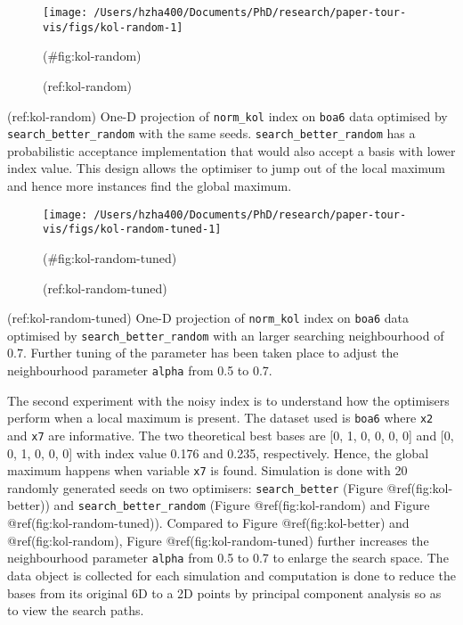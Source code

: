 \begin{Schunk}
\begin{figure}

{\centering \texttt{[image: /Users/hzha400/Documents/PhD/research/paper-tour-vis/figs/kol-random-1]} 

}

\caption[(ref:kol-random)]{(ref:kol-random)}(\#fig:kol-random)
\end{figure}
\end{Schunk}

(ref:kol-random) One-D projection of \texttt{norm\_kol} index on \texttt{boa6} data optimised by \texttt{search\_better\_random} with the same seeds. \texttt{search\_better\_random} has a probabilistic acceptance implementation that would also accept a basis with lower index value. This design allows the optimiser to jump out of the local maximum and hence more instances find the global maximum.

\begin{Schunk}
\begin{figure}

{\centering \texttt{[image: /Users/hzha400/Documents/PhD/research/paper-tour-vis/figs/kol-random-tuned-1]} 

}

\caption[(ref:kol-random-tuned)]{(ref:kol-random-tuned)}(\#fig:kol-random-tuned)
\end{figure}
\end{Schunk}

(ref:kol-random-tuned) One-D projection of \texttt{norm\_kol} index on \texttt{boa6} data optimised by \texttt{search\_better\_random} with an larger searching neighbourhood of 0.7. Further tuning of the parameter has been taken place to adjust the neighbourhood parameter \texttt{alpha} from 0.5 to 0.7.

The second experiment with the noisy index is to understand how the optimisers perform when a local maximum is present. The dataset used is \texttt{boa6} where \texttt{x2} and \texttt{x7} are informative. The two theoretical best bases are {[}0, 1, 0, 0, 0, 0{]} and {[}0, 0, 1, 0, 0, 0{]} with index value 0.176 and 0.235, respectively. Hence, the global maximum happens when variable \texttt{x7} is found. Simulation is done with 20 randomly generated seeds on two optimisers: \texttt{search\_better} (Figure @ref(fig:kol-better)) and \texttt{search\_better\_random} (Figure @ref(fig:kol-random) and Figure @ref(fig:kol-random-tuned)). Compared to Figure @ref(fig:kol-better) and @ref(fig:kol-random), Figure @ref(fig:kol-random-tuned) further increases the neighbourhood parameter \texttt{alpha} from 0.5 to 0.7 to enlarge the search space. The data object is collected for each simulation and computation is done to reduce the bases from its original 6D to a 2D points by principal component analysis so as to view the search paths.

